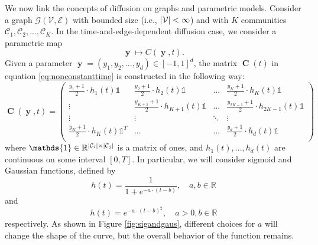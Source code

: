 \documentclass[12pt, oneside]{report}   	%
\newcommand{\R}{\mathbb{R}}
\DeclarePairedDelimiter{\abs}{\lvert}{\rvert}
\DeclareMathOperator{\CC}{\boldsymbol{C}}
\DeclareMathOperator{\y}{\boldsymbol{y}}
\begin{document}
We now link the concepts of diffusion on graphs and parametric models. Consider a graph $\mathcal{G}(\mathcal{V}, \mathcal{E})$ with bounded size (i.e., $\abs{\mathcal{V}}<\infty$) and with $K$ communities $\mathcal{C}_1, \mathcal{C}_2, ..., \mathcal{C}_K$. In the time-and-edge-dependent diffusion case, we consider a parametric map 
\begin{equation}
\label{eq:parametricmap}
\y\mapsto C(\y,t).    
\end{equation}
Given a parameter $\y=(y_1,y_2,...,y_d)\in [-1,1]^d$, the matrix $\CC(t)$ in equation \eqref{eq:nonconstanttime} is constructed in the following way:
\begin{equation}
\label{eq:Ct}
\CC(\y,t) = \begin{pmatrix}
\frac{y_1+1}{2}\cdot h_1(t)\mathds{1} & \frac{y_2+1}{2}\cdot h_2(t)\mathds{1} & ... & \frac{y_K+1}{2}\cdot h_K(t)\mathds{1} \\
\vdots & \frac{y_{K+1}+1}{2}\cdot h_{K+1}(t)\mathds{1} & ... & \frac{y_{2K-1}+1}{2}\cdot h_{2K-1}(t)\mathds{1} \\
\vdots & \vdots & \ddots & \vdots \\
\frac{y_K+1}{2}\cdot h_K(t)\mathds{1}^T & ... & ... & \frac{y_d+1}{2}\cdot h_d(t)\mathds{1} \\
\end{pmatrix}
\end{equation}
where $\mathds{1}\in\R^{\abs{\mathcal{C}_i}\times\abs{\mathcal{C}_j}}$ is a matrix of ones, and $h_1(t),...,h_d(t)$ are continuous on some interval $[0,T]$. In particular, we will consider sigmoid and Gaussian functions, defined by
\begin{equation}
\label{eq:sigmoid}
h(t) = \frac{1}{1+e^{-a\cdot(t-b)}} , \quad a,b\in\R
\end{equation}
and 
\begin{equation}
\label{eq:gaussian}
h(t) = e^{-a\cdot(t-b)^2}, \quad a>0, b\in\R
\end{equation}
respectively. As shown in Figure \ref{fig:sigandgaus}, different choices for $a$ will change the shape of the curve, but the overall behavior of the function remains.
\end{document}
